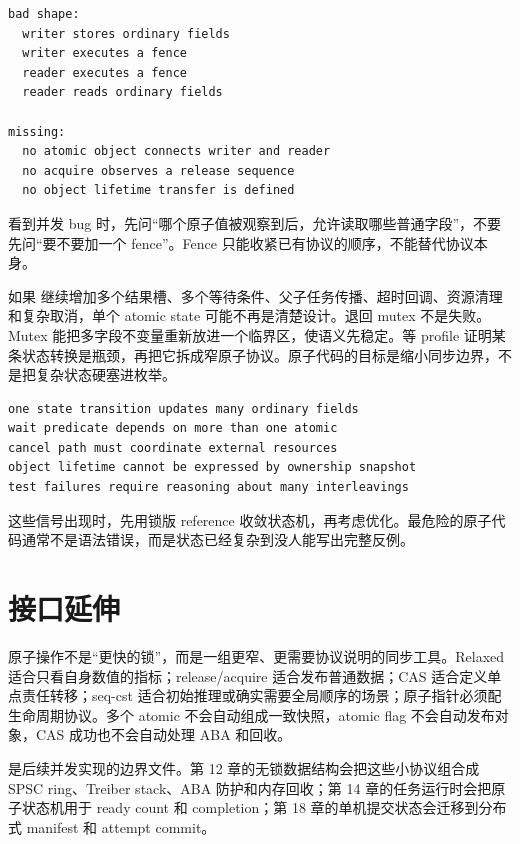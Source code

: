 \begin{lstlisting}[numbers=none,caption={fence 不能替代协议变量}]
bad shape:
  writer stores ordinary fields
  writer executes a fence
  reader executes a fence
  reader reads ordinary fields

missing:
  no atomic object connects writer and reader
  no acquire observes a release sequence
  no object lifetime transfer is defined
\end{lstlisting}

看到并发 bug 时，先问“哪个原子值被观察到后，允许读取哪些普通字段”，不要先问“要不要加一个 fence”。Fence 只能收紧已有协议的顺序，不能替代协议本身。

如果  继续增加多个结果槽、多个等待条件、父子任务传播、超时回调、资源清理和复杂取消，单个 atomic state 可能不再是清楚设计。退回 mutex 不是失败。Mutex 能把多字段不变量重新放进一个临界区，使语义先稳定。等 profile 证明某条状态转换是瓶颈，再把它拆成窄原子协议。原子代码的目标是缩小同步边界，不是把复杂状态硬塞进枚举。

\begin{lstlisting}[numbers=none,caption={退回锁版的信号}]
one state transition updates many ordinary fields
wait predicate depends on more than one atomic
cancel path must coordinate external resources
object lifetime cannot be expressed by ownership snapshot
test failures require reasoning about many interleavings
\end{lstlisting}

这些信号出现时，先用锁版 reference 收敛状态机，再考虑优化。最危险的原子代码通常不是语法错误，而是状态已经复杂到没人能写出完整反例。

\section{接口延伸}

原子操作不是“更快的锁”，而是一组更窄、更需要协议说明的同步工具。Relaxed 适合只看自身数值的指标；release/acquire 适合发布普通数据；CAS 适合定义单点责任转移；seq-cst 适合初始推理或确实需要全局顺序的场景；原子指针必须配生命周期协议。多个 atomic 不会自动组成一致快照，atomic flag 不会自动发布对象，CAS 成功也不会自动处理 ABA 和回收。

 是后续并发实现的边界文件。第 12 章的无锁数据结构会把这些小协议组合成 SPSC ring、Treiber stack、ABA 防护和内存回收；第 14 章的任务运行时会把原子状态机用于 ready count 和 completion；第 18 章的单机提交状态会迁移到分布式 manifest 和 attempt commit。

